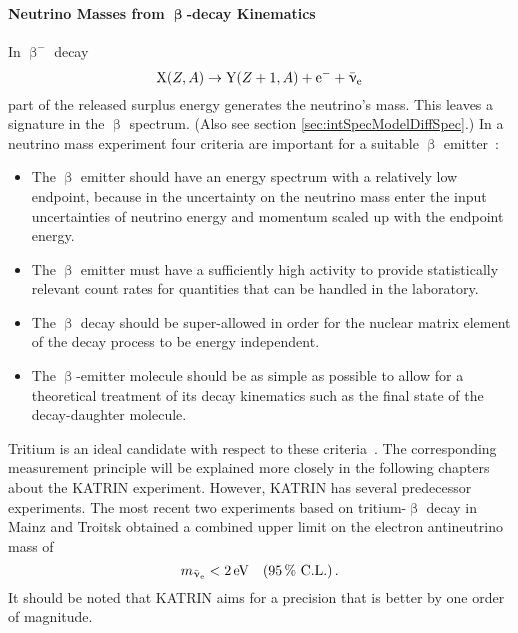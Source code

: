 \paragraph{Neutrino Masses from $\boldsymbol{\upbeta}$-decay Kinematics} 
In $\upbeta^-$ decay
\begin{equation}
    \ce{X}(Z,A) \rightarrow \ce{Y}(Z+1,A) + \ce{e^-} + \aeneutrino
\end{equation}
part of the released surplus energy generates the neutrino's mass. This leaves a signature in the $\upbeta$ spectrum. (Also see section \ref{sec:intSpecModelDiffSpec}.) In a neutrino mass experiment four criteria  are important for a suitable $\upbeta$ emitter~\cite{Otten:2008zz}:
\begin{itemize}
	\item The $\upbeta$ emitter should have an energy spectrum with a relatively low endpoint, because in the uncertainty on the neutrino mass enter the input uncertainties of neutrino energy and	momentum scaled up with the endpoint energy.
	\item The $\upbeta$ emitter must have a sufficiently high activity to provide statistically relevant count rates for quantities that can be handled in the laboratory.
	\item The $\upbeta$ decay should be super-allowed in order for the nuclear matrix element of the decay process to be energy independent.
	\item The $\upbeta$-emitter molecule should be as simple as possible to allow for a theoretical treatment of its decay kinematics such as the final state of the decay-daughter molecule.
\end{itemize}
Tritium is an ideal candidate with respect to these criteria~\cite{Otten:2008zz}. The corresponding measurement principle will be explained more closely in the following chapters about the KATRIN experiment. However, KATRIN has several predecessor experiments. The most recent two experiments based on tritium-$\upbeta$ decay in Mainz and Troitsk obtained a combined upper limit on the electron antineutrino mass of~\cite{Kraus2005, Aseev:2011dq, ReviewOfParticlePhysics}
\begin{equation*}
    m_{\bar{\upnu}_{\mathrm{e}}} < \SI{2}{eV} \quad (\SI{95}{\percent} \text{ C.L.}) \text{\,.} 
\end{equation*}
It should be noted that KATRIN aims for a precision that is better by one order of magnitude.
\FloatBarrier